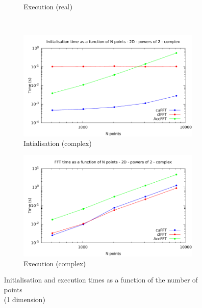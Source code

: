 \documentclass[12pt, a4paper]{article}
\begin{document}
\begin{figure}[H]
\begin{subfigure}{.5\textwidth}
\caption{Execution (real)}
\label{FFTPOW21DRE}
\end{subfigure}\\
\begin{subfigure}{.5\textwidth}
\centering
\includegraphics[width=.9\linewidth]{graphs/fft-2d-pow2-c-init.pdf}
\caption{Intialisation (complex)}
\label{FFTPOW21DCI}
\end{subfigure}%
\begin{subfigure}{.5\textwidth}
\centering
\includegraphics[width=.9\linewidth]{graphs/fft-2d-pow2-c-exec.pdf}
\caption{Execution (complex)}
\label{FFTPOW21DCE}
\end{subfigure}
\caption{Initialisation and execution times as a function of the number of points\\(1 dimension)}
\label{FFTPOW21D}
\end{figure}
\end{document}
